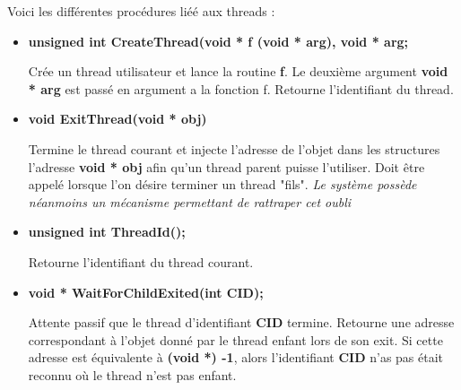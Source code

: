 \documentclass{article}
\begin{document}
Voici les différentes procédures liéé aux threads :
\begin{itemize}
 
    \item 
    \textbf{unsigned int CreateThread(void * f (void * arg), void * arg;}
    
    Crée un thread utilisateur et lance la routine \textbf{f}. Le deuxième argument 
    \textbf{void * arg} est passé en argument a la fonction f.
    Retourne l'identifiant du thread.
   
   \item 
   \textbf{void ExitThread(void * obj)} 
   
   Termine le thread courant et injecte l'adresse de l'objet dans les structures l'adresse \textbf{void * obj} afin qu'un thread parent puisse l'utiliser. Doit être appelé lorsque l'on désire terminer un thread "fils". \textit{Le système possède néanmoins un mécanisme permettant de rattraper cet oubli }
   
   \item 
   \textbf{unsigned int ThreadId();}
   
  Retourne l'identifiant du thread courant.   
   
   \item
   \textbf{void * WaitForChildExited(int CID);} 
   
   Attente passif que le thread d'identifiant \textbf{CID} termine. Retourne une adresse correspondant à l'objet donné par le thread enfant lors de son exit. Si cette adresse est équivalente à \textbf{(void *) -1}, alors l'identifiant \textbf{CID} n'as pas était reconnu où le thread n'est pas enfant.
   
    
\end{itemize}
\end{document}
